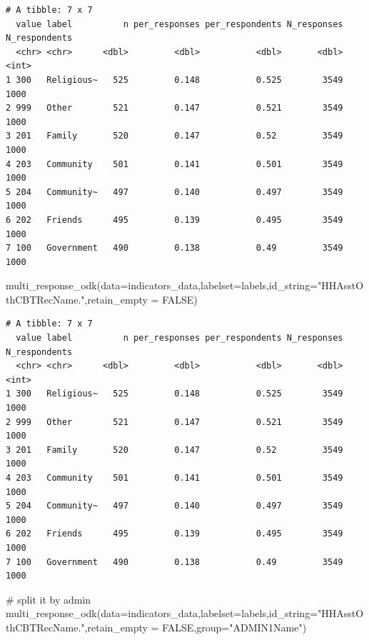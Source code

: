 \documentclass[
  letterpaper,
  DIV=11,
  numbers=noendperiod]{scrreprt}
\newenvironment{Shaded}{\begin{snugshade}}{\end{snugshade}}
\newcommand{\AttributeTok}[1]{\textcolor[rgb]{0.40,0.45,0.13}{#1}}
\newcommand{\CommentTok}[1]{\textcolor[rgb]{0.37,0.37,0.37}{#1}}
\newcommand{\ConstantTok}[1]{\textcolor[rgb]{0.56,0.35,0.01}{#1}}
\newcommand{\FunctionTok}[1]{\textcolor[rgb]{0.28,0.35,0.67}{#1}}
\newcommand{\NormalTok}[1]{\textcolor[rgb]{0.00,0.23,0.31}{#1}}
\newcommand{\StringTok}[1]{\textcolor[rgb]{0.13,0.47,0.30}{#1}}
\begin{document}
\begin{verbatim}
# A tibble: 7 x 7
  value label          n per_responses per_respondents N_responses N_respondents
  <chr> <chr>      <dbl>         <dbl>           <dbl>       <dbl>         <int>
1 300   Religious~   525         0.148           0.525        3549          1000
2 999   Other        521         0.147           0.521        3549          1000
3 201   Family       520         0.147           0.52         3549          1000
4 203   Community    501         0.141           0.501        3549          1000
5 204   Community~   497         0.140           0.497        3549          1000
6 202   Friends      495         0.139           0.495        3549          1000
7 100   Government   490         0.138           0.49         3549          1000
\end{verbatim}

\begin{Shaded}
\begin{Highlighting}[]
\FunctionTok{multi\_response\_odk}\NormalTok{(}\AttributeTok{data=}\NormalTok{indicators\_data,}\AttributeTok{labelset=}\NormalTok{labels,}\AttributeTok{id\_string=}\StringTok{"HHAsstOthCBTRecName."}\NormalTok{,}\AttributeTok{retain\_empty =} \ConstantTok{FALSE}\NormalTok{)}
\end{Highlighting}
\end{Shaded}

\begin{verbatim}
# A tibble: 7 x 7
  value label          n per_responses per_respondents N_responses N_respondents
  <chr> <chr>      <dbl>         <dbl>           <dbl>       <dbl>         <int>
1 300   Religious~   525         0.148           0.525        3549          1000
2 999   Other        521         0.147           0.521        3549          1000
3 201   Family       520         0.147           0.52         3549          1000
4 203   Community    501         0.141           0.501        3549          1000
5 204   Community~   497         0.140           0.497        3549          1000
6 202   Friends      495         0.139           0.495        3549          1000
7 100   Government   490         0.138           0.49         3549          1000
\end{verbatim}

\begin{Shaded}
\begin{Highlighting}[]
\CommentTok{\# split it by admin}
\FunctionTok{multi\_response\_odk}\NormalTok{(}\AttributeTok{data=}\NormalTok{indicators\_data,}\AttributeTok{labelset=}\NormalTok{labels,}\AttributeTok{id\_string=}\StringTok{"HHAsstOthCBTRecName."}\NormalTok{,}\AttributeTok{retain\_empty =} \ConstantTok{FALSE}\NormalTok{,}\AttributeTok{group=}\StringTok{"ADMIN1Name"}\NormalTok{)}
\end{Highlighting}
\end{Shaded}
\end{document}
